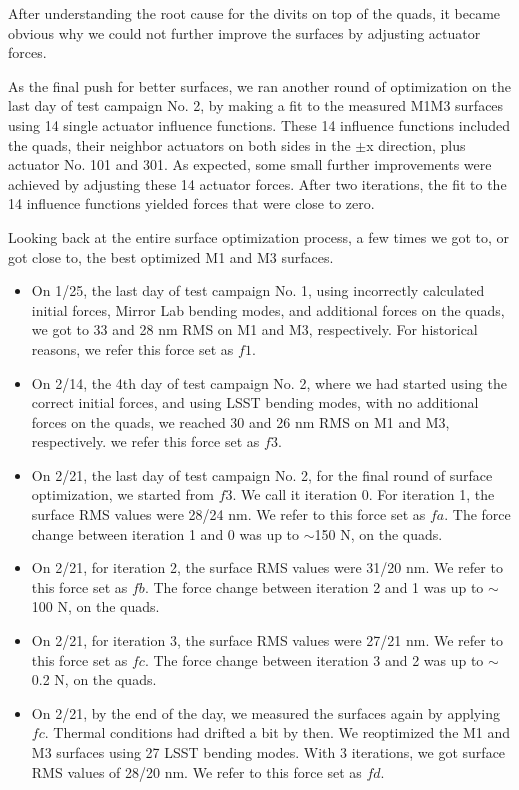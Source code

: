 \documentclass [twoside,openbib,12pt]{article}
\newcommand{\bitm}{\begin{itemize}}
\newcommand{\eitm}{\end{itemize}}
\begin{document}
 After understanding the root cause for the divits on top of the
 quads, it became obvious why we could not further improve the surfaces by
 adjusting actuator forces.

 As the final push for better surfaces, we ran another round of
 optimization on the last day of test campaign No. 2, by making a fit
 to the measured M1M3 surfaces using 14 single actuator influence
 functions.
 These 14 influence functions included the quads, their neighbor
 actuators on both sides in the $\pm$x direction, plus actuator
 No. 101 and 301.
 As expected, some small further improvements were achieved by
 adjusting these 14 actuator forces.
 After two iterations, the fit to the 14 influence functions yielded
 forces that were close to zero.


 Looking back at the entire surface optimization process, a few times
 we got to, or got close to, the best optimized M1 and M3 surfaces.
 \bitm
\item On 1/25, the last day of test campaign No. 1, using incorrectly
  calculated initial forces, Mirror Lab bending modes, and additional
  forces on the quads, we got to 33 and 28 nm RMS on M1 and M3,
  respectively. For historical reasons, we refer this force set as $f1$.
  \item On 2/14, the 4th day of test campaign No. 2, where we had
    started using the correct initial forces, and using LSST bending
    modes, with no additional forces on the quads, we reached 30 and
    26 nm RMS on M1 and M3,
    respectively. we refer this force set as $f3$.
    \item On 2/21, the last day of test campaign No. 2, for the final
      round of surface optimization, we started from $f3$. We call it
      iteration 0. For iteration 1, the surface RMS values were 28/24
      nm. We refer to this force set as $fa$. The force change between
      iteration 1 and 0 was up to $\sim$150 N, on the quads.
      \item On 2/21, for iteration 2, the surface RMS values were 31/20
      nm. We refer to this force set as $fb$. The force change between
      iteration 2 and 1 was up to $\sim$100 N, on the quads.
      \item On 2/21, for iteration 3, the surface RMS values were 27/21
      nm. We refer to this force set as $fc$. The force change between
      iteration 3 and 2 was up to $\sim$0.2 N, on the quads.
      \item On 2/21, by the end of the day, we measured the surfaces
        again by applying $fc$. Thermal conditions had drifted a bit
        by then. We reoptimized the M1 and M3 surfaces using 27 LSST
        bending modes. With 3 iterations, we got surface RMS values of
        28/20 nm. We refer to this force set as $fd$.
  \eitm
\end{document}
